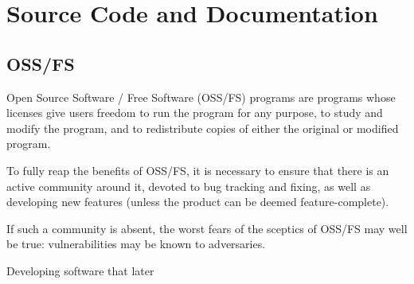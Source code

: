 
\section{Source Code and Documentation}

\subsection{OSS/FS}

Open Source Software / Free Software (OSS/FS) programs are programs whose
licenses give users freedom to run the program for any purpose, to study and
modify the program, and to redistribute copies of either the original or
modified program\cite{why-oss-fs}.

To fully reap the benefits of OSS/FS, it is necessary to ensure that there is
an active community around it, devoted to bug tracking and fixing, as well as
developing new features (unless the product can be deemed feature-complete).

If such a community is absent, the worst fears of the sceptics of OSS/FS may
well be true: vulnerabilities may be known to adversaries.



Developing software that later

